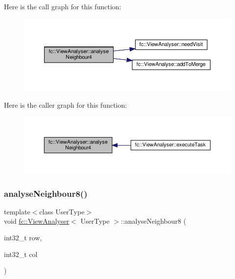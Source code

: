 Here is the call graph for this function\+:
\nopagebreak
\begin{figure}[H]
\begin{center}
\leavevmode
\includegraphics[width=350pt]{df/daf/classfc_1_1ViewAnalyser_a8ae4286b034a9f4b99f7b629d5fbed95_cgraph}
\end{center}
\end{figure}
Here is the caller graph for this function\+:
\nopagebreak
\begin{figure}[H]
\begin{center}
\leavevmode
\includegraphics[width=350pt]{df/daf/classfc_1_1ViewAnalyser_a8ae4286b034a9f4b99f7b629d5fbed95_icgraph}
\end{center}
\end{figure}
\mbox{\label{classfc_1_1ViewAnalyser_ae29f29bef0e7b1b7ccc48f0f6be593ae}} 
\subsubsection{\texorpdfstring{analyse\+Neighbour8()}{analyseNeighbour8()}}
{\footnotesize\ttfamily template$<$class User\+Type$>$ \\
void \hyperlink{classfc_1_1ViewAnalyser}{fc\+::\+View\+Analyser}$<$ User\+Type $>$\+::analyse\+Neighbour8 (\begin{DoxyParamCaption}\item[{int32\+\_\+t}]{row,  }\item[{int32\+\_\+t}]{col }\end{DoxyParamCaption})\hspace{0.3cm}{\ttfamily [inline]}}



